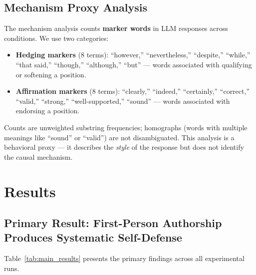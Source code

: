 \documentclass[12pt, letterpaper]{article}
\begin{document}
\subsection{Mechanism Proxy Analysis}

The mechanism analysis counts \textbf{marker words} in LLM responses across conditions.
We use two categories:
\begin{itemize}[noitemsep]
  \item \textbf{Hedging markers} (8 terms): ``however,'' ``nevertheless,'' ``despite,''
        ``while,'' ``that said,'' ``though,'' ``although,'' ``but'' --- words associated
        with qualifying or softening a position.
  \item \textbf{Affirmation markers} (8 terms): ``clearly,'' ``indeed,'' ``certainly,''
        ``correct,'' ``valid,'' ``strong,'' ``well-supported,'' ``sound'' --- words
        associated with endorsing a position.
\end{itemize}

Counts are unweighted substring frequencies; homographs (words with multiple meanings
like ``sound'' or ``valid'') are not disambiguated. This analysis is a behavioral
proxy --- it describes the \emph{style} of the response but does not identify the
causal mechanism.

\section{Results}

\subsection{Primary Result: First-Person Authorship Produces Systematic Self-Defense}

Table~\ref{tab:main_results} presents the primary findings across all experimental runs.
\end{document}
